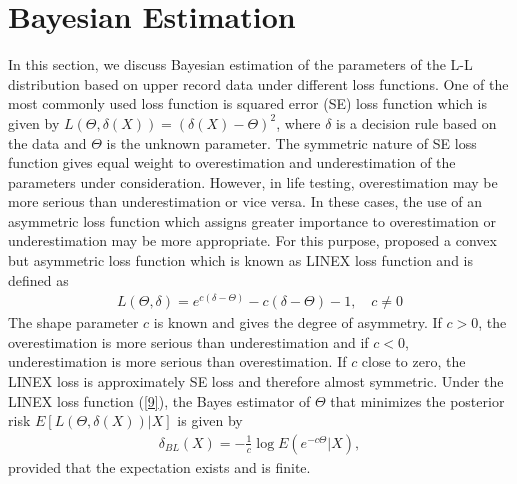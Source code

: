 \documentclass[twoside]{article}
\begin{document}
\section{Bayesian Estimation}
In this section, we discuss Bayesian estimation of the parameters of the L-L distribution based on upper record data under different loss functions. One of the most commonly used loss function is squared error (SE) loss function which is given by $L(\Theta ,\delta (X)) = {(\delta (X) - \Theta )^2}$, where $\delta$ is a decision rule based on the data and $\Theta$ is the unknown parameter. The symmetric nature of SE loss function gives equal weight to overestimation and underestimation of the parameters under consideration. However, in life testing, overestimation may be more serious than underestimation or vice versa. In these cases, the use of an asymmetric loss function which assigns greater importance to overestimation or underestimation may be more appropriate. For this purpose, \cite{6} proposed a convex but asymmetric loss function which is known as LINEX loss function and is defined as
\begin{eqnarray} \label{9}
L(\Theta ,\delta ) = {e^{c(\delta  - \Theta )}} - c(\delta  - \Theta ) - 1, \quad c \ne 0
\end{eqnarray}
The shape parameter $c$ is known and gives the degree of asymmetry.  If $c>0$, the overestimation is more serious than underestimation and if $c<0$, underestimation is more serious than overestimation. If $c$ close to zero, the LINEX loss is approximately SE loss and therefore almost symmetric. Under the LINEX loss function (\ref{9}), the Bayes estimator of $\Theta$ that minimizes the posterior risk $E\left[ {L(\Theta ,\delta (X))|X} \right]$ is given by
\begin{eqnarray} \label{10}
{\delta _{BL}}(X) =  - \frac{1}{c}\log E\left( {{e^{ - c\Theta }}|X} \right),
\end{eqnarray}
provided that the expectation exists and is finite. 
\end{document}
